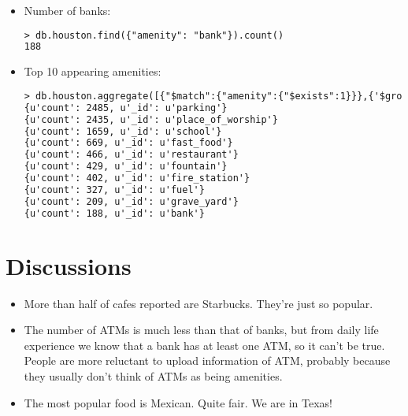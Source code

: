 \documentclass[12pt]{article}
\begin{document}
\begin{itemize}
\item Number of banks:
\begin{lstlisting}[language=xml,breaklines=tr, basicstyle=\small,keywordstyle=\color{blue!70},commentstyle=\color{red!50!green!50!blue!50},frame=shadowbox, rulesepcolor=\color{red!20!green!20!blue!20}]
> db.houston.find({"amenity": "bank"}).count()
188
\end{lstlisting}

\item Top 10 appearing amenities:
\begin{lstlisting}[language=xml,breaklines=tr, basicstyle=\small,keywordstyle=\color{blue!70},commentstyle=\color{red!50!green!50!blue!50},frame=shadowbox, rulesepcolor=\color{red!20!green!20!blue!20}]
> db.houston.aggregate([{"$match":{"amenity":{"$exists":1}}},{'$group':{'_id':'$amenity', 'count':{'$sum':1}}}, {'$sort':{'count':-1}}, {'$limit': 10}]):
{u'count': 2485, u'_id': u'parking'}
{u'count': 2435, u'_id': u'place_of_worship'}
{u'count': 1659, u'_id': u'school'}
{u'count': 669, u'_id': u'fast_food'}
{u'count': 466, u'_id': u'restaurant'}
{u'count': 429, u'_id': u'fountain'}
{u'count': 402, u'_id': u'fire_station'}
{u'count': 327, u'_id': u'fuel'}
{u'count': 209, u'_id': u'grave_yard'}
{u'count': 188, u'_id': u'bank'}
\end{lstlisting}
\end{itemize}

\section{Discussions}
\begin{itemize}
\item More than half of cafes reported are Starbucks. They're just so popular.
\item The number of ATMs is much less than that of banks, but from daily life experience we know that a bank has at least one ATM, so it can't be true. People are more reluctant to upload information of ATM, probably because they usually don't think of ATMs as being amenities.
\item  The most popular food is Mexican. Quite fair. We are in Texas!
\end{itemize}
\end{document}
